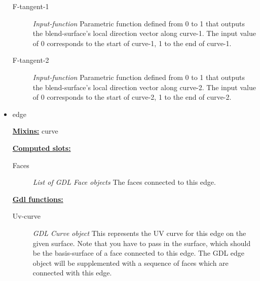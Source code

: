 \documentclass [11pt]{book}
\begin{document}
\begin{itemize}
\begin{description}
\item [F-tangent-1]
\emph{Input-function} Parametric function defined from 0 to 1 that outputs the blend-surface's local direction vector along curve-1. The input value of 0 corresponds to the start of curve-1, 1 to the end of curve-1.


\item [F-tangent-2]
\emph{Input-function} Parametric function defined from 0 to 1 that outputs the blend-surface's local direction vector along curve-2. The input value of 0 corresponds to the start of curve-2, 1 to the end of curve-2.


\end{description}







\item {}edge


\textbf{
\underline{Mixins:}} curve





\begin{description}

\end{description}








\textbf{
\underline{Computed slots:}}

\begin{description}

\item [Faces]
\emph{List of GDL Face objects} The faces connected to this edge.


\end{description}






\textbf{
\underline{Gdl functions:}}

\begin{description}

\item [Uv-curve]
\emph{GDL Curve object} This represents the UV curve for this edge on the given surface.
Note that you  have to pass in the surface, which should be the basis-surface of a face connected
to this edge. The GDL edge object will be supplemented with a sequence of faces which are connected
with this edge.



\end{description}
\end{itemize}
\end{document}
